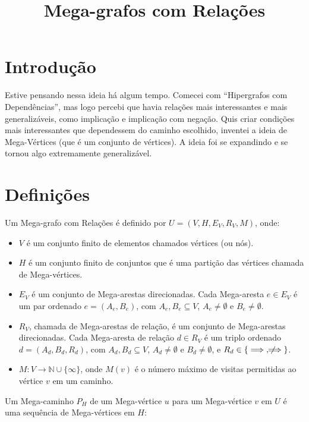 \documentclass{article}
\title{Mega-grafos com Relações}
\author{}
\begin{document}
\maketitle

\section{Introdução}

Estive pensando nessa ideia há algum tempo. Comecei com ``Hipergrafos com Dependências'', mas logo percebi que havia relações mais interessantes e mais generalizáveis, como implicação e implicação com negação. Quis criar condições mais interessantes que dependessem do caminho escolhido, inventei a ideia de Mega-Vértices (que é um conjunto de vértices). A ideia foi se expandindo e se tornou algo extremamente generalizável.

\section{Definições}

Um Mega-grafo com Relações é definido por \( U = (V, H, E_V, R_V, M) \), onde:

\begin{itemize}
    \item \( V \) é um conjunto finito de elementos chamados vértices (ou nós).
    \item \( H \) é um conjunto finito de conjuntos que é uma partição das vértices chamada de Mega-vértices.
    \item \( E_V \) é um conjunto de Mega-arestas direcionadas. Cada Mega-aresta \( e \in E_V \) é um par ordenado \( e = (A_e, B_e) \), com \( A_e, B_e \subseteq V \), \( A_e \neq \emptyset \) e \( B_e \neq \emptyset \).
    \item \( R_V \), chamada de Mega-arestas de relação, é um conjunto de Mega-arestas direcionadas. Cada Mega-aresta de relação \( d \in R_V \) é um triplo ordenado \( d = (A_d, B_d, R_d) \), com \( A_d, B_d \subseteq V \), \( A_d \neq \emptyset \) e \( B_d \neq \emptyset \), e \( R_d \in \{\implies, \not\!\!\!\implies\} \).
    \item \( M: V \to \mathbb{N} \cup \{\infty\} \), onde \( M(v) \) é o número máximo de visitas permitidas ao vértice \( v \) em um caminho.
\end{itemize}

Um Mega-caminho \( P_H \) de um Mega-vértice \( u \) para um Mega-vértice \( v \) em \( U \) é uma sequência de Mega-vértices em \( H \):
\end{document}
